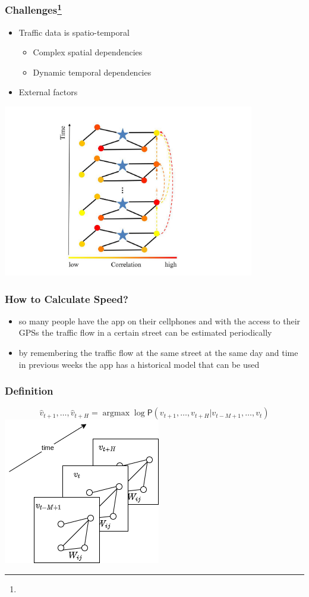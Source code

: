 \documentclass{beamer}
\begin{document}
\begin{frame}
	\frametitle{Challenges\footnote{}}
  \begin{itemize}
      \item Traffic data is spatio-temporal
      \begin{itemize}
        \item Complex spatial dependencies
        \item Dynamic temporal dependencies
      \end{itemize}
      \item External factors
  \end{itemize}
  \centering
	\includegraphics[height=0.5\textheight]{./img/correlations.png}
\end{frame}
\begin{frame}
	\frametitle{How to Calculate Speed?}
  \begin{itemize}
      \item so many people have the app on their cellphones and with the access to their GPSs the traffic flow in a certain street can be estimated periodically
      \item by remembering the traffic flow at the same street at the same day and time in previous weeks the app has a historical model that can be used
  \end{itemize}
\end{frame}
\begin{frame}
  \frametitle{Definition}
  \begin{equation}
    \label{eq:base}
    \hat{v}_{t+1}, \ldots,  \hat{v}_{t+H} = \mathop{\mathrm{argmax}} \log \mathsf{P}({v}_{t+1}, \ldots,  v_{t+H} | v_{t-M+1} , \ldots,  v_{t})
  \end{equation}
  \centering
  \includegraphics[height=.5\textheight]{img/base.png}
\end{frame}
\end{document}
